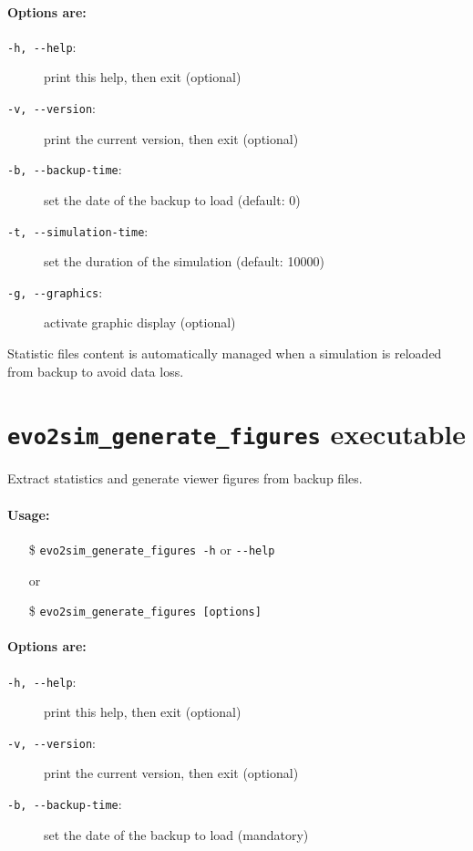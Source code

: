\paragraph{Options are:}
\begin{description}
        \item[\texttt{-h, -{}-help}:] print this help, then exit (optional)
        \item[\texttt{-v, -{}-version}:] print the current version, then exit (optional)
        \item[\texttt{-b, -{}-backup-time}:] set the date of the backup to load (default: 0)
        \item[\texttt{-t, -{}-simulation-time}:] set the duration of the simulation (default: 10000)
        \item[\texttt{-g, -{}-graphics}:]  activate graphic display (optional)
\end{description}
Statistic files content is automatically managed when a simulation is reloaded from backup to avoid data loss.

\section{\texttt{evo2sim\_generate\_figures} executable}
Extract statistics and generate viewer figures from backup files.
\paragraph{Usage:}
\begin{itemize}
        \item[\$] \texttt{evo2sim\_generate\_figures -h} or \texttt{-{}-help}
        \item[or]
        \item[\$] \texttt{evo2sim\_generate\_figures [options]}
\end{itemize}
\paragraph{Options are:}
\begin{description}
        \item[\texttt{-h, -{}-help}:] print this help, then exit (optional)
        \item[\texttt{-v, -{}-version}:] print the current version, then exit (optional)
        \item[\texttt{-b, -{}-backup-time}:] set the date of the backup to load (mandatory)
\end{description}

